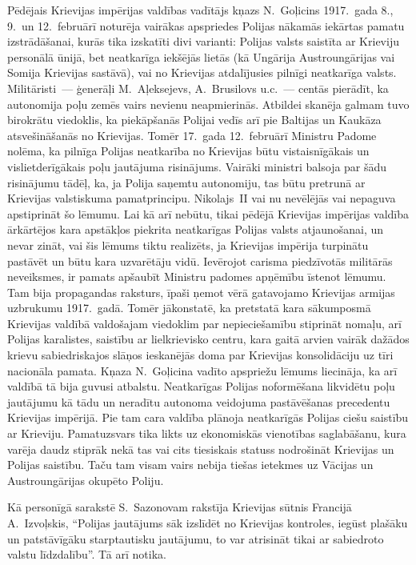 \documentclass[twoside,a5paper,12pt,fleqn,openany]{extbook}
\begin{document}
Pēdējais Krievijas impērijas valdības vadītājs kņazs N.~Goļicins 1917.~gada 8., 9.~un 12.~februārī noturēja vairākas apspriedes Polijas nākamās iekārtas pamatu izstrādāšanai, kurās tika izskatīti divi varianti: Polijas valsts saistīta ar Krieviju personālā ūnijā, bet neatkarīga iekšējās lietās (kā Ungārija Austroungārijas vai Somija Krievijas sastāvā), vai no Krievijas atdalījusies pilnīgi neatkarīga valsts. Militāristi~--- ģenerāļi M.~Aļeksejevs, A.~Brusilovs u.c.~--- centās pierādīt, ka autonomija poļu zemēs vairs nevienu neapmierinās. Atbildei skanēja galmam tuvo birokrātu viedoklis, ka piekāpšanās Polijai vedīs arī pie Baltijas un Kaukāza atsvešināšanās no Krievijas. Tomēr 17.~gada 12.~februārī Ministru Padome nolēma, ka pilnīga Polijas neatkarība no Krievijas būtu vistaisnīgākais un vislietderīgākais poļu jautājuma risinājums. Vairāki ministri balsoja par šādu risinājumu tādēļ, ka, ja Polija saņemtu autonomiju, tas būtu pretrunā ar Krievijas valstiskuma pamatprincipu. Nikolajs~II vai nu nevēlējās vai nepaguva apstiprināt šo lēmumu. Lai kā arī nebūtu, tikai pēdējā Krievijas impērijas valdība ārkārtējos kara apstākļos piekrita neatkarīgas Polijas valsts atjaunošanai, un nevar zināt, vai šis lēmums tiktu realizēts, ja Krievijas impērija turpinātu pastāvēt un būtu kara uzvarētāju vidū. Ievērojot carisma piedzīvotās militārās neveiksmes, ir pamats apšaubīt Ministru padomes apņēmību īstenot lēmumu. Tam bija propagandas raksturs, īpaši ņemot vērā gatavojamo Krievijas armijas uzbrukumu 1917.~gadā. Tomēr jākonstatē, ka pretstatā kara sākumposmā Krievijas valdībā valdošajam viedoklim par nepieciešamību stiprināt nomaļu, arī Polijas karalistes, saistību ar lielkrievisko centru, kara gaitā arvien vairāk dažādos krievu sabiedriskajos slāņos ieskanējās doma par Krievijas konsolidāciju uz tīri nacionāla pamata. Kņaza N.~Goļicina vadīto apspriežu lēmums liecināja, ka arī valdībā tā bija guvusi atbalstu. Neatkarīgas Polijas noformēšana likvidētu poļu jautājumu kā tādu un neradītu autonoma veidojuma pastāvēšanas precedentu Krievijas impērijā. Pie tam cara valdība plānoja neatkarīgās Polijas ciešu saistību ar Krieviju. Pamatuzsvars tika likts uz ekonomiskās vienotības saglabāšanu, kura varēja daudz stiprāk nekā tas vai cits tiesiskais statuss nodrošināt Krievijas un Polijas saistību. Taču tam visam vairs nebija tiešas ietekmes uz Vācijas un Austroungārijas okupēto Poliju.

Kā personīgā sarakstē S.~Sazonovam rakstīja Krievijas sūtnis Francijā A.~Izvoļskis, ``Polijas jautājums sāk izslīdēt no Krievijas kontroles, iegūst plašāku un patstāvīgāku starptautisku jautājumu, to var atrisināt tikai ar sabiedroto valstu līdzdalību''. Tā arī notika.
\end{document}
